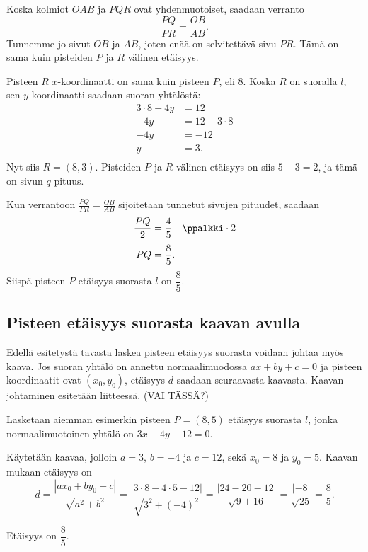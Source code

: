 Koska kolmiot $OAB$ ja $PQR$ ovat yhdenmuotoiset, saadaan verranto
\[
\frac{PQ}{PR}=\frac{OB}{AB}.
\]
Tunnemme jo sivut $OB$ ja $AB$, joten enää on selvitettävä sivu $PR$. Tämä on sama kuin pisteiden $P$ ja $R$ välinen etäisyys.

Pisteen $R$ $x$-koordinaatti on sama kuin pisteen $P$, eli 8. Koska $R$ on suoralla $l$, sen $y$-koordinaatti saadaan suoran yhtälöstä:
\begin{align*}
3\cdot 8-4y & =12 \\
-4y & =12-3\cdot 8 \\
-4y & =-12 \\
y & =3. \\
\end{align*}
Nyt siis $R=(8, 3)$. Pisteiden $P$ ja $R$ välinen etäisyys on siis $5-3=2$, ja tämä on sivun $q$ pituus.

Kun verrantoon $\frac{PQ}{PR}=\frac{OB}{AB}$ sijoitetaan tunnetut sivujen pituudet, saadaan
\begin{align*}
\frac{PQ}{2} & =\frac{4}{5} \quad \ppalkki \cdot 2 \\[3pt]
PQ & =\frac{8}{5}.
\end{align*}
Siispä pisteen $P$ etäisyys suorasta $l$ on $\dfrac{8}{5}$.

\subsection*{Pisteen etäisyys suorasta kaavan avulla}

Edellä esitetystä tavasta laskea pisteen etäisyys suorasta voidaan johtaa myös kaava.
Jos suoran yhtälö on annettu normaalimuodossa $ax+by+c=0$ ja pisteen koordinaatit ovat $(x_0, y_0)$, etäisyys $d$ saadaan seuraavasta kaavasta.
Kaavan johtaminen esitetään liitteessä. (VAI TÄSSÄ?)

\begin{esimerkki} Lasketaan aiemman esimerkin pisteen $P=(8, 5)$ etäisyys suorasta $l$, jonka normaalimuotoinen yhtälö on $3x-4y-12=0$.
\begin{esimratk}
Käytetään kaavaa, jolloin $a=3$, $b=-4$ ja $c=12$, sekä $x_0=8$ ja $y_0=5$. Kaavan mukaan etäisyys on
\[
d=\frac{|ax_0+by_0+c|}{\sqrt{a^2+b^2}}
=\frac{|3\cdot 8-4\cdot 5-12|}{\sqrt{3^2+(-4)^2}}
=\frac{|24-20-12|}{\sqrt{9+16}}=\frac{|-8|}{\sqrt{25}}
=\frac{8}{5}.
\]
\end{esimratk}
\begin{esimvast}
Etäisyys on $\dfrac{8}{5}$.
\end{esimvast}
\end{esimerkki}

